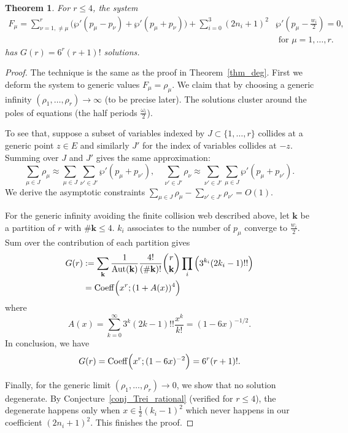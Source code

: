 \documentclass[11pt]{amsart}
\newtheorem{theorem}{Theorem}[section]
\theoremstyle{remark}
\numberwithin{equation}{section}
\begin{document}
\begin{theorem} \label{thm:Treibich_conj}
For $r\leq 4$, the system 
\[
\begin{split}
    F_\mu = \sum_{\nu =1, \neq \mu}^r \Big( \wp'(p_\mu-p_\nu) + \wp'(p_\mu+p_\nu) \Big) + \sum_{i=0}^3 (2n_i+1)^2 & \wp'(p_\mu - \frac{w_i}{2}) =0, 
    \\
    &\text{ for }\mu=1,\dots,r.
\end{split}
\]
has $G(r) = 6^r (r+1)!$ solutions.
\end{theorem}
\begin{proof}
The technique is the same as the proof in Theorem~\ref{thm_deg}. First we deform the system to generic values $F_\mu = \rho_\mu$. 
We claim that by choosing a generic infinity $(\rho_1,\dots,\rho_r) \rightarrow \infty$ (to be precise later). The solutions cluster around the poles of equations (the half periods $\frac{\omega_i}{2}$).  

To see that, suppose a subset of variables indexed by $J \subset \{1, \dots, r\}$ collides at a generic point $z \in E$ and similarly $J'$ for the index of variables collides at $-z$. Summing over $J$ and $J'$ gives the same approximation:
\[
     \sum_{\mu \in J} \rho_\mu \approx \sum_{\mu \in J} \sum_{\nu' \in J'} \wp'(p_\mu + p_{\nu'}), \quad \sum_{\nu' \in J'} \rho_\nu \approx  \sum_{\nu' \in J'} \sum_{\mu \in J}\wp'(p_\mu + p_{\nu'}).
\]
We derive the asymptotic constraints $\sum_{\mu\in J} \rho_\mu - \sum_{\nu'\in J'} \rho_{\nu'} = O(1)$. 

For the generic infinity avoiding the finite collision web described above, 
let $\mathbf{k}$ be a partition of $r$ with $\# \mathbf{k} \leq 4$. $k_i$ associates to the number of $p_\mu$ converge to $\frac{w_i}{2}$. Sum over the contribution of each partition gives 
\[
\begin{split}
    G(r) &:= \sum_{\mathbf{k}} \frac{1}{{\rm Aut}(\mathbf{k})} \frac{4!}{( \#\mathbf{k})!}  \binom{r}{\mathbf{k}} \prod_i \Big(3^{k_i} (2k_i-1)!!\Big)
    \\
    & = {\rm Coeff}\Big(x^r; (1+A(x))^4\Big)
\end{split}
\]
where 
\[
    A(x) = \sum_{k=0}^{\infty} 3^k (2k-1)!! \frac{x^k}{k!} = (1 - 6x)^{-1/2}.
\]
In conclusion, we have
\[
    G(r) = {\rm Coeff}\Big(x^r;(1-6x)^{-2}\Big) = 6^r (r+1)!.
\]

Finally, for the generic limit $(\rho_1,\dots,\rho_r) \rightarrow  0$, we show that no solution degenerate. By Conjecture~\ref{conj_Trei_rational} (verified for $r\leq 4$), the degenerate happens only when $x \in \frac{1}{2} (k_i-1)^2$ which never happens in our coefficient $(2n_i+1)^2$. 
This finishes the proof.
\end{proof}
\end{document}
